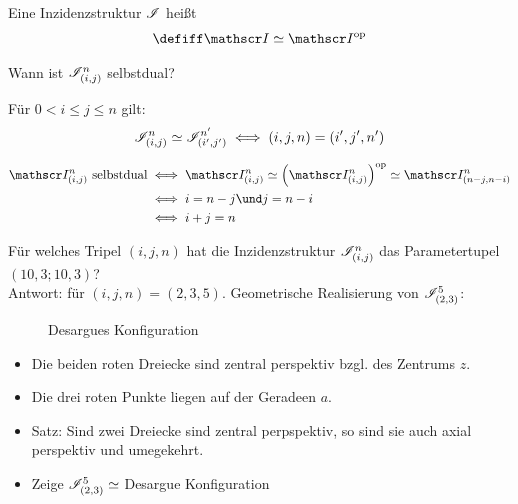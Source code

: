 \begin{definition}
	Eine Inzidenzstruktur $\mathscr{I}$ heißt 
	\begin{align*}
		\defiff\Inz\simeq\Inz^\op
	\end{align*}
\end{definition}

Wann ist $\mathscr{I}_{(i,j)}^n$ selbstdual?

\begin{lemma}
	Für $0<i\leq j\leq n$ gilt:
	\begin{align*}
		\mathscr{I}_{(i,j)}^n\simeq\mathscr{I}_{(i',j')}^{n'}\iff
		(i,j,n)=(i',j',n')
	\end{align*}
\end{lemma}

\begin{satz}
	\begin{align*}
		\Inz_{(i,j)}^n\text{ selbstdual}
		&\iff \Inz_{(i,j)}^n\simeq\Big(\Inz_{(i,j)}^n\Big)^\op\simeq \Inz_{(n-j,n-i)}^n\\
		&\iff i=n-j\und j=n-i\\
		&\iff i+j=n
	\end{align*}
\end{satz}

\begin{beispiel}
	Für welches Tripel $(i,j,n)$ hat die Inzidenzstruktur $\mathscr{I}_{(i,j)}^n$ das Parametertupel $(10,3;10,3)$?\\
	Antwort: für $(i,j,n)=(2,3,5)$.
	Geometrische Realisierung von $\mathscr{I}_{(2,3)}^5$:
	\begin{figure}[H] %
		\begin{center}
			
			\caption{Desargues Konfiguration}
		\end{center}
	\end{figure}
	\begin{itemize}
		\item Die beiden roten Dreiecke sind zentral perspektiv bzgl. des Zentrums $z$.
		\item Die drei roten Punkte liegen auf der Geradeen $a$.
		\item Satz: Sind zwei Dreiecke sind zentral perpspektiv, so sind sie auch axial perspektiv und umegekehrt.
		\item Zeige $\mathscr{I}_{(2,3)}^5\simeq$ Desargue Konfiguration
	\end{itemize}
\end{beispiel}

